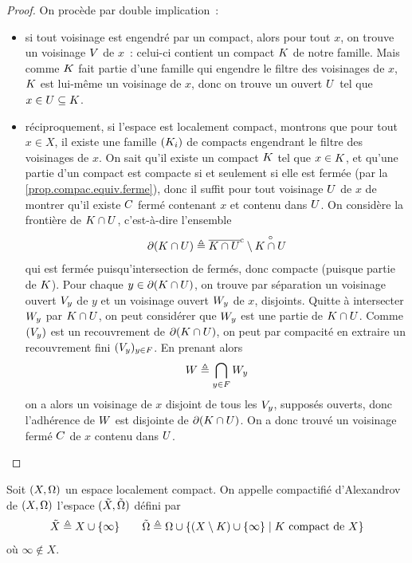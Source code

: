 \begin{proof}
  On procède par double implication~:
  \begin{itemize}
  \item si tout voisinage est engendré par un compact, alors pour tout $x$, on
    trouve un voisinage $V$ de $x$~: celui-ci contient un compact $K$
    de notre famille. Mais comme $K$ fait partie d'une famille qui engendre
    le filtre des voisinages de $x$, $K$ est lui-même un voisinage de $x$,
    donc on trouve un ouvert $U$ tel que $x \in U \subseteq K$.
  \item réciproquement, si l'espace est localement compact, montrons que pour
    tout $x \in X$, il existe une famille $(K_i)$ de compacts engendrant
    le filtre des voisinages de $x$. On sait qu'il existe un compact $K$
    tel que $x \in K$, et qu'une partie d'un compact est compacte si et
    seulement si elle est fermée (par la \cref{prop.compac.equiv.ferme}), donc
    il suffit pour tout voisinage $U$ de $x$ de montrer qu'il existe
    $C$ fermé contenant $x$ et contenu dans $U$. On considère la
    frontière de $K \cap U$, c'est-à-dire l'ensemble
    \[\mathbin{\partial}(K \cap U) \triangleq
    \overline{K \cap U}^{\mathrm c} \setminus \overset{\circ}{K \cap U}\]
    qui est fermée puisqu'intersection de fermés, donc compacte (puisque partie
    de $K$). Pour chaque $y \in \mathbin{\partial}(K \cap U)$, on trouve par
    séparation un voisinage ouvert $V_y$ de $y$ et un voisinage ouvert
    $W_y$ de $x$, disjoints. Quitte à intersecter $W_y$ par
    $K\cap U$, on peut considérer que $W_y$ est une partie de
    $K \cap U$. Comme $(V_y)$ est un recouvrement de
    $\mathbin{\partial}(K\cap U)$, on peut par compacité en extraire un
    recouvrement fini $(V_y)_{y \in F}$. En prenant alors
    \[W \triangleq \bigcap_{y \in F} W_y\]
    on a alors un voisinage de $x$ disjoint de tous les $V_y$, supposés
    ouverts, donc l'adhérence de $W$ est disjointe de
    $\mathbin{\partial}(K \cap U)$. On a donc trouvé un voisinage fermé $C$
    de $x$ contenu dans $U$.\qedhere
  \end{itemize}
\end{proof}

\begin{definition}
  Soit $(X,\Omega)$ un espace localement compact. On appelle compactifié
  d'Alexandrov de $(X,\Omega)$ l'espace $(\tilde{X},\tilde{\Omega})$ défini par
  \[\tilde{X} \triangleq X\cup \{\infty\}\qquad
  \tilde{\Omega}\triangleq \Omega \cup
  \left\{ (X\setminus K) \cup \{\infty\} \;\middle\vert\; K \text{ compact de } X \right\}\]
  où $\infty\notin X$.
\end{definition}

